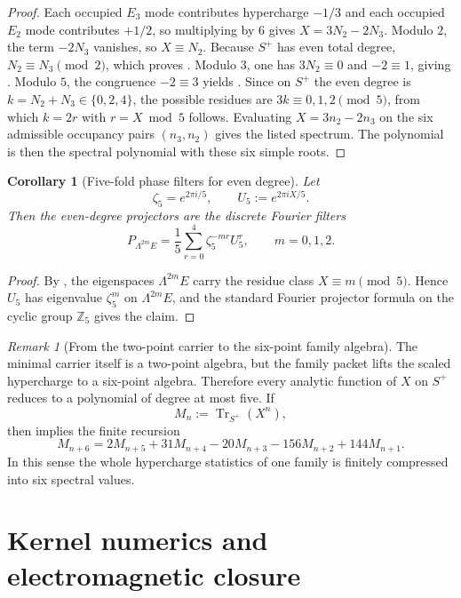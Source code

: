 \documentclass[11pt,a4paper]{article}
\newtheorem{corollary}[theorem]{Corollary}
\theoremstyle{definition}
\theoremstyle{remark}
\newtheorem*{remark}{Remark}
\DeclareMathOperator{\tr}{Tr}
\begin{document}
\begin{proof}
Each occupied $E_3$ mode contributes hypercharge $-1/3$ and each occupied $E_2$ mode contributes $+1/2$, so multiplying by $6$ gives $X=3N_2-2N_3$. Modulo $2$, the term $-2N_3$ vanishes, so $X\equiv N_2$. Because $S^+$ has even total degree, $N_2\equiv N_3\pmod 2$, which proves . Modulo $3$, one has $3N_2\equiv 0$ and $-2\equiv 1$, giving . Modulo $5$, the congruence $-2\equiv 3$ yields . Since on $S^+$ the even degree is $k=N_2+N_3\in\{0,2,4\}$, the possible residues are $3k\equiv 0,1,2\pmod 5$, from which $k=2r$ with $r=X\bmod 5$ follows. Evaluating $X=3n_2-2n_3$ on the six admissible occupancy pairs $(n_3,n_2)$ gives the listed spectrum. The polynomial  is then the spectral polynomial with these six simple roots.
\end{proof}

\begin{corollary}[Five-fold phase filters for even degree]
\label{cor:family-degree-filters}
Let
\[
\zeta_5=e^{2\pi i/5},
\qquad
U_5:=e^{2\pi iX/5}.
\]
Then the even-degree projectors are the discrete Fourier filters
\[
P_{\Lambda^{2m}E}
=
\frac15\sum_{r=0}^{4}\zeta_5^{-mr}U_5^r,
\qquad
m=0,1,2.
\]
\end{corollary}

\begin{proof}
By , the eigenspaces $\Lambda^{2m}E$ carry the residue class $X\equiv m\pmod 5$. Hence $U_5$ has eigenvalue $\zeta_5^m$ on $\Lambda^{2m}E$, and the standard Fourier projector formula on the cyclic group $\mathbb Z_5$ gives the claim.
\end{proof}

\begin{remark}[From the two-point carrier to the six-point family algebra]
The minimal carrier itself is a two-point algebra, but the family packet lifts the scaled hypercharge to a six-point algebra. Therefore every analytic function of $X$ on $S^+$ reduces to a polynomial of degree at most five. If
\[
M_n:=\tr_{S^+}(X^n),
\]
then  implies the finite recursion
\[
M_{n+6}
=
2M_{n+5}+31M_{n+4}-20M_{n+3}-156M_{n+2}+144M_{n+1}.
\]
In this sense the whole hypercharge statistics of one family is finitely compressed into six spectral values.
\end{remark}

\section{Kernel numerics and electromagnetic closure}
\end{document}
